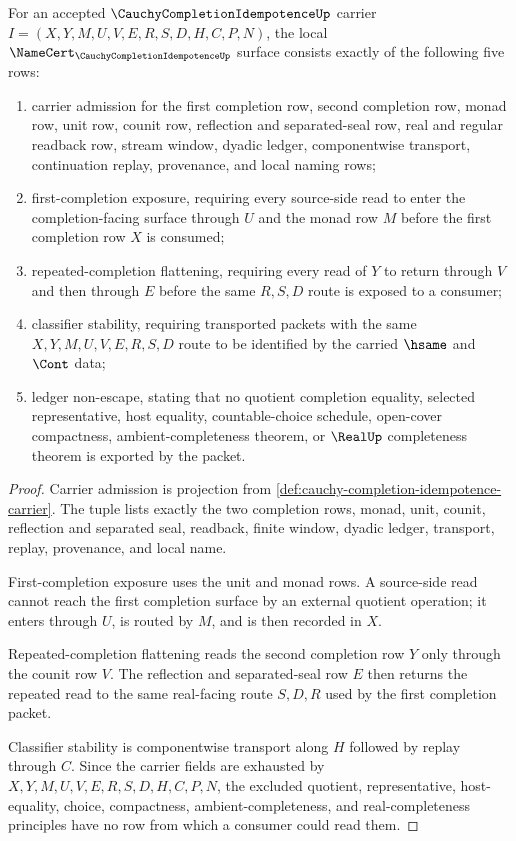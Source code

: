 \begin{theorem}
\label{thm:cauchy-completion-idempotence-namecert-obligations}
For an accepted $\CauchyCompletionIdempotenceUp$ carrier $I=(X,Y,M,U,V,E,R,S,D,H,C,P,N)$, the local $\NameCert_{\CauchyCompletionIdempotenceUp}$ surface consists exactly of the following five rows:
\begin{enumerate}
\item carrier admission for the first completion row, second completion row, monad row, unit row, counit row, reflection and separated-seal row, real and regular readback row, stream window, dyadic ledger, componentwise transport, continuation replay, provenance, and local naming rows;
\item first-completion exposure, requiring every source-side read to enter the completion-facing surface through $U$ and the monad row $M$ before the first completion row $X$ is consumed;
\item repeated-completion flattening, requiring every read of $Y$ to return through $V$ and then through $E$ before the same $R,S,D$ route is exposed to a consumer;
\item classifier stability, requiring transported packets with the same $X,Y,M,U,V,E,R,S,D$ route to be identified by the carried $\hsame$ and $\Cont$ data;
\item ledger non-escape, stating that no quotient completion equality, selected representative, host equality, countable-choice schedule, open-cover compactness, ambient-completeness theorem, or $\RealUp$ completeness theorem is exported by the packet.
\end{enumerate}
\end{theorem}
\begin{proof}
Carrier admission is projection from \autoref{def:cauchy-completion-idempotence-carrier}. The tuple lists exactly the two completion rows, monad, unit, counit, reflection and separated seal, readback, finite window, dyadic ledger, transport, replay, provenance, and local name.

First-completion exposure uses the unit and monad rows. A source-side read cannot reach the first completion surface by an external quotient operation; it enters through $U$, is routed by $M$, and is then recorded in $X$.

Repeated-completion flattening reads the second completion row $Y$ only through the counit row $V$. The reflection and separated-seal row $E$ then returns the repeated read to the same real-facing route $S,D,R$ used by the first completion packet.

Classifier stability is componentwise transport along $H$ followed by replay through $C$. Since the carrier fields are exhausted by $X,Y,M,U,V,E,R,S,D,H,C,P,N$, the excluded quotient, representative, host-equality, choice, compactness, ambient-completeness, and real-completeness principles have no row from which a consumer could read them.
\end{proof}

